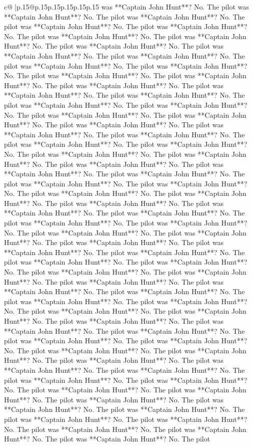 \documentclass{article}
\begin{document}
{\begin{supertabular}{c@{$\;$}|p{.15\linewidth}@{}p{.15\linewidth}p{.15\linewidth}p{.15\linewidth}p{.15\linewidth}p{.15\linewidth}}
{{{was **Captain John Hunt**? No. The pilot was **Captain John Hunt**? No. The pilot was **Captain John Hunt**? No. The pilot was **Captain John Hunt**? No. The pilot was **Captain John Hunt**? No. The pilot was **Captain John Hunt**? No. The pilot was **Captain John Hunt**? No. The pilot was **Captain John Hunt**? No. The pilot was **Captain John Hunt**? No. The pilot was **Captain John Hunt**? No. The pilot was **Captain John Hunt**? No. The pilot was **Captain John Hunt**? No. The pilot was **Captain John Hunt**? No. The pilot was **Captain John Hunt**? No. The pilot was **Captain John Hunt**? No. The pilot was **Captain John Hunt**? No. The pilot was **Captain John Hunt**? No. The pilot was **Captain John Hunt**? No. The pilot was **Captain John Hunt**? No. The pilot was **Captain John Hunt**? No. The pilot was **Captain John Hunt**? No. The pilot was **Captain John Hunt**? No. The pilot was **Captain John Hunt**? No. The pilot was **Captain John Hunt**? No. The pilot was **Captain John Hunt**? No. The pilot was **Captain John Hunt**? No. The pilot was **Captain John Hunt**? No. The pilot was **Captain John Hunt**? No. The pilot was **Captain John Hunt**? No. The pilot was **Captain John Hunt**? No. The pilot was **Captain John Hunt**? No. The pilot was **Captain John Hunt**? No. The pilot was **Captain John Hunt**? No. The pilot was **Captain John Hunt**? No. The pilot was **Captain John Hunt**? No. The pilot was **Captain John Hunt**? No. The pilot was **Captain John Hunt**? No. The pilot was **Captain John Hunt**? No. The pilot was **Captain John Hunt**? No. The pilot was **Captain John Hunt**? No. The pilot was **Captain John Hunt**? No. The pilot was **Captain John Hunt**? No. The pilot was **Captain John Hunt**? No. The pilot was **Captain John Hunt**? No. The pilot was **Captain John Hunt**? No. The pilot was **Captain John Hunt**? No. The pilot was **Captain John Hunt**? No. The pilot was **Captain John Hunt**? No. The pilot was **Captain John Hunt**? No. The pilot was **Captain John Hunt**? No. The pilot was **Captain John Hunt**? No. The pilot was **Captain John Hunt**? No. The pilot was **Captain John Hunt**? No. The pilot was **Captain John Hunt**? No. The pilot was **Captain John Hunt**? No. The pilot was **Captain John Hunt**? No. The pilot was **Captain John Hunt**? No. The pilot was **Captain John Hunt**? No. The pilot was **Captain John Hunt**? No. The pilot was **Captain John Hunt**? No. The pilot was **Captain John Hunt**? No. The pilot was **Captain John Hunt**? No. The pilot was **Captain John Hunt**? No. The pilot was **Captain John Hunt**? No. The pilot was **Captain John Hunt**? No. The pilot was **Captain John Hunt**? No. The pilot was **Captain John Hunt**? No. The pilot was **Captain John Hunt**? No. The pilot was **Captain John Hunt**? No. The pilot was **Captain John Hunt**? No. The pilot was **Captain John Hunt**? No. The pilot was **Captain John Hunt**? No. The pilot was **Captain John Hunt**? No. The pilot was **Captain John Hunt**? No. The pilot was **Captain John Hunt**? No. The pilot was **Captain John Hunt**? No. The pilot was **Captain John Hunt**? No. The pilot was **Captain John Hunt**? No. The pilot }}}
\end{supertabular}}
\end{document}

